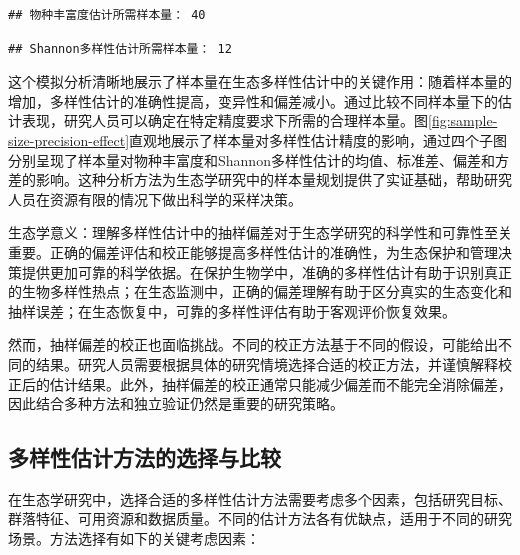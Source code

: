 \documentclass[
  twoside,12pt,fontset=none]{ctexbook}
\begin{document}
\begin{verbatim}
## 物种丰富度估计所需样本量： 40
\end{verbatim}

\begin{verbatim}
## Shannon多样性估计所需样本量： 12
\end{verbatim}

这个模拟分析清晰地展示了样本量在生态多样性估计中的关键作用：随着样本量的增加，多样性估计的准确性提高，变异性和偏差减小。通过比较不同样本量下的估计表现，研究人员可以确定在特定精度要求下所需的合理样本量。图\ref{fig:sample-size-precision-effect}直观地展示了样本量对多样性估计精度的影响，通过四个子图分别呈现了样本量对物种丰富度和Shannon多样性估计的均值、标准差、偏差和方差的影响。这种分析方法为生态学研究中的样本量规划提供了实证基础，帮助研究人员在资源有限的情况下做出科学的采样决策。

生态学意义：理解多样性估计中的抽样偏差对于生态学研究的科学性和可靠性至关重要。正确的偏差评估和校正能够提高多样性估计的准确性，为生态保护和管理决策提供更加可靠的科学依据。在保护生物学中，准确的多样性估计有助于识别真正的生物多样性热点；在生态监测中，正确的偏差理解有助于区分真实的生态变化和抽样误差；在生态恢复中，可靠的多样性评估有助于客观评价恢复效果。

然而，抽样偏差的校正也面临挑战。不同的校正方法基于不同的假设，可能给出不同的结果。研究人员需要根据具体的研究情境选择合适的校正方法，并谨慎解释校正后的估计结果。此外，抽样偏差的校正通常只能减少偏差而不能完全消除偏差，因此结合多种方法和独立验证仍然是重要的研究策略。

\hypertarget{ux591aux6837ux6027ux4f30ux8ba1ux65b9ux6cd5ux7684ux9009ux62e9ux4e0eux6bd4ux8f83}{%
\subsection{多样性估计方法的选择与比较}\label{ux591aux6837ux6027ux4f30ux8ba1ux65b9ux6cd5ux7684ux9009ux62e9ux4e0eux6bd4ux8f83}}

在生态学研究中，选择合适的多样性估计方法需要考虑多个因素，包括研究目标、群落特征、可用资源和数据质量。不同的估计方法各有优缺点，适用于不同的研究场景。方法选择有如下的关键考虑因素：
\end{document}
